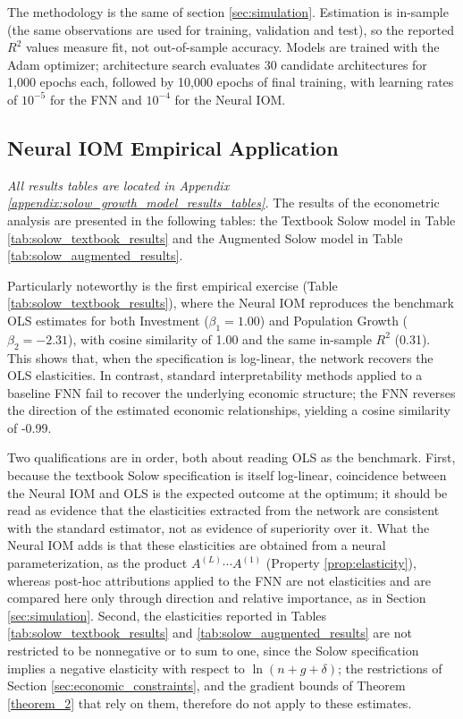\documentclass[preprint,12pt,authoryear]{sn-jnl}
\begin{document}
The methodology is the same of section \ref{sec:simulation}. Estimation is in-sample (the same observations are used for training, validation and test), so the reported $R^2$ values measure fit, not out-of-sample accuracy. Models are trained with the Adam optimizer; architecture search evaluates 30 candidate architectures for 1,000 epochs each, followed by 10,000 epochs of final training, with learning rates of $10^{-5}$ for the FNN and $10^{-4}$ for the Neural IOM. 

\subsection{Neural IOM Empirical Application}

\textit{All results tables are located in Appendix \ref{appendix:solow_growth_model_results_tables}.} The results of the econometric analysis are presented in the following tables: the Textbook Solow model in Table \ref{tab:solow_textbook_results} and the Augmented Solow model in Table \ref{tab:solow_augmented_results}.

Particularly noteworthy is the first empirical exercise (Table \ref{tab:solow_textbook_results}), where the Neural IOM reproduces the benchmark OLS estimates for both Investment ($\beta_1 = 1.00$) and Population Growth ($\beta_2 = -2.31$), with cosine similarity of 1.00 and the same in-sample $R^2$ (0.31). This shows that, when the specification is log-linear, the network recovers the OLS elasticities. In contrast, standard interpretability methods applied to a baseline FNN fail to recover the underlying economic structure; the FNN reverses the direction of the estimated economic relationships, yielding a cosine similarity of -0.99.

Two qualifications are in order, both about reading OLS as the benchmark. First, because the textbook Solow specification is itself log-linear, coincidence between the Neural IOM and OLS is the expected outcome at the optimum; it should be read as evidence that the elasticities extracted from the network are consistent with the standard estimator, not as evidence of superiority over it. What the Neural IOM adds is that these elasticities are obtained from a neural parameterization, as the product $A^{(L)}\cdots A^{(1)}$ (Property \ref{prop:elasticity}), whereas post-hoc attributions applied to the FNN are not elasticities and are compared here only through direction and relative importance, as in Section \ref{sec:simulation}. Second, the elasticities reported in Tables \ref{tab:solow_textbook_results} and \ref{tab:solow_augmented_results} are not restricted to be nonnegative or to sum to one, since the Solow specification implies a negative elasticity with respect to $\ln(n+g+\delta)$; the restrictions of Section \ref{sec:economic_constraints}, and the gradient bounds of Theorem \ref{theorem_2} that rely on them, therefore do not apply to these estimates.
\end{document}
